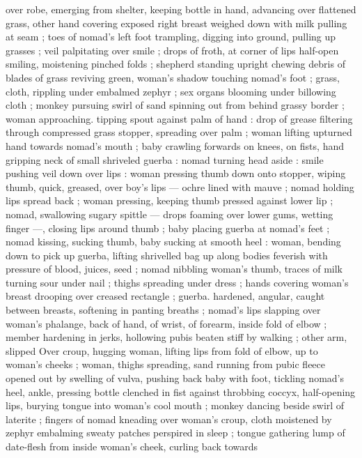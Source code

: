 over robe, emerging from shelter, keeping bottle in hand, advancing 
over flattened grass, other hand covering exposed right breast 
weighed down with milk pulling at seam ; toes of nomad's left foot 
trampling, digging into ground, pulling up grasses ; veil palpitating 
over smile ; drops of froth, at corner of lips half-open smiling, 
moistening pinched folds ; shepherd standing upright chewing debris 
of blades of grass reviving green, woman's shadow touching 
nomad's foot ; grass, cloth, rippling under embalmed zephyr ; sex 
organs blooming under billowing cloth ; monkey pursuing swirl of 
sand spinning out from behind grassy border ; woman approaching. 
tipping spout against palm of hand : drop of grease filtering through 
compressed grass stopper, spreading over palm ; woman lifting 
upturned hand towards nomad's mouth ; baby crawling forwards on 
knees, on fists, hand gripping neck of small shriveled guerba : 
nomad turning head aside : smile pushing veil down over lips : 
woman pressing thumb down onto stopper, wiping thumb, quick, 
greased, over boy's lips --- ochre lined with mauve ; nomad holding 
lips spread back ; woman pressing, keeping thumb pressed against 
lower lip ; nomad, swallowing sugary spittle --- drops foaming over 
lower gums, wetting finger ---, closing lips around thumb ; baby 
placing guerba at nomad's feet ; nomad kissing, sucking thumb, baby 
sucking at smooth heel : woman, bending down to pick up guerba, 
lifting shrivelled bag up along bodies feverish with pressure of 
blood, juices, seed ; nomad nibbling woman's thumb, traces of milk 
turning sour under nail ; thighs spreading under dress ; hands 
covering woman's breast drooping over creased rectangle ; guerba. 
hardened, angular, caught between breasts, softening in panting 
breaths ; nomad's lips slapping over woman's phalange, back of 
hand, of wrist, of forearm, inside fold of elbow ; member hardening 
in jerks, hollowing pubis beaten stiff by walking ; other arm, slipped 
Over croup, hugging woman, lifting lips from fold of elbow, up to 
woman's cheeks ; woman, thighs spreading, sand running from pubic 
fleece opened out by swelling of vulva, pushing back baby with foot, 
tickling nomad's heel, ankle, pressing bottle clenched in fist against 
throbbing coccyx, half-opening lips, burying tongue into woman's 
cool mouth ; monkey dancing beside swirl of laterite ; fingers of 
nomad kneading over woman's croup, cloth moistened by zephyr 
embalming sweaty patches perspired in sleep ; tongue gathering 
lump of date-flesh from inside woman's cheek, curling back towards 
